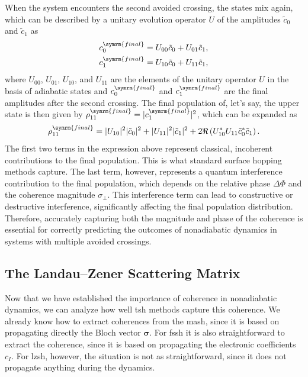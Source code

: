 When the system encounters the second avoided crossing, the states mix again, which can be described by a unitary evolution operator $U$ of the amplitudes $\tilde c_0$ and $\tilde c_1$ as
\begin{align}
c_0^{\symrm{final}}&=U_{00}\tilde c_0+U_{01}\tilde c_1,\\
c_1^{\symrm{final}}&=U_{10}\tilde c_0+U_{11}\tilde c_1,
\end{align}
where $U_{00}$, $U_{01}$, $U_{10}$, and $U_{11}$ are the elements of the unitary operator $U$ in the basis of adiabatic states and $c_0^{\symrm{final}}$ and $c_1^{\symrm{final}}$ are the final amplitudes after the second crossing. The final population of, let's say, the upper state is then given by $\rho_{11}^{\symrm{final}}=|c_1^{\symrm{final}}|^2$, which can be expanded as
\begin{equation}
\rho_{11}^{\symrm{final}}=|U_{10}|^2|\tilde c_0|^2+|U_{11}|^2|\tilde c_1|^2+2\Re\left(U_{10}^*U_{11}\tilde c_0^\ast\tilde c_1\right).
\end{equation}
The first two terms in the expression above represent classical, incoherent contributions to the final population. This is what standard surface hopping methods capture. The last term, however, represents a quantum interference contribution to the final population, which depends on the relative phase $\Delta\Phi$ and the coherence magnitude $\sigma_\perp$. This interference term can lead to constructive or destructive interference, significantly affecting the final population distribution. Therefore, accurately capturing both the magnitude and phase of the coherence is essential for correctly predicting the outcomes of nonadiabatic dynamics in systems with multiple avoided crossings.
\subsection{The Landau--Zener Scattering Matrix}
Now that we have established the importance of coherence in nonadiabatic dynamics, we can analyze how well \gls{tsh} methods capture this coherence. We already know how to extract coherences from the \gls{mash}, since it is based on propagating directly the Bloch vector $\symbf{\sigma}$. For \gls{fssh} it is also straightforward to extract the coherence, since it is based on propagating the electronic coefficients $c_I$. For \gls{lzsh}, however, the situation is not as straightforward, since it does not propagate anything during the dynamics.

